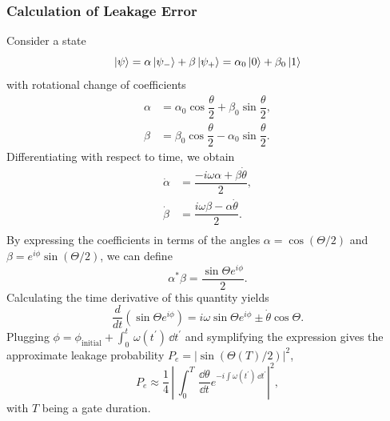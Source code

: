 \subsubsection{Calculation of Leakage Error} \label{subsec:leakage}
Consider a state
$$
  \ket{\psi} = \alpha \ket{\psi_{-}}+\beta\ket{\psi_+} = \alpha_0\ket{0}+\beta_0\ket{1}
$$
with rotational change of coefficients
\begin{align*}
  \alpha & = \alpha_0\cos\dfrac{\theta}{2} + \beta_0\sin\dfrac{\theta}{2},  \\
  \beta  & =  \beta_0\cos\dfrac{\theta}{2} - \alpha_0\sin\dfrac{\theta}{2}.
\end{align*}
Differentiating with respect to time, we obtain
\begin{align*}
  \dot{\alpha} & = \dfrac{-i\omega \alpha+\beta \dot{\theta}}{2}, \\
  \dot{\beta}  & = \dfrac{i\omega \beta-\alpha \dot{\theta}}{2}.  \\
\end{align*}
By expressing the coefficients in terms of the angles $\alpha = \cos (\Theta/2)$ and $\beta=e^{i\phi}\sin(\Theta/2)$, we can
define
$$
  \alpha^* \beta = \dfrac{\sin\Theta e^{i\phi}}{2}.
$$
Calculating the time derivative of this quantity yields
$$
  \frac{d}{dt}(\sin\Theta e^{i\phi}) = i\omega \sin\Theta e^{i\phi}  \pm  \dot{\theta}\cos\Theta.
$$
Plugging $\phi=\phi_{\text{initial}} + \int_0^t\,\omega(t^\prime)\,\dd t^\prime$ and
symplifying the expression gives the approximate leakage probability $P_e=|\sin(\Theta(T)/2)|^2$,
\begin{equation}
  P_e \approx \dfrac{1}{4}\, \left\lvert\, \int_0^T \,\dfrac{\dd\theta}{\dd t} e^{-i\int\omega(t^\prime)\,\dd t^\prime}\right\rvert^2,
  \label{eq:leakage}
\end{equation}
with $T$ being a gate duration.


